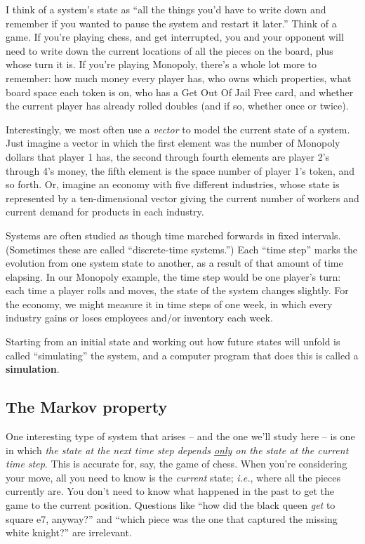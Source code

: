 
I think of a system's state as ``all the things you'd have to write down and
remember if you wanted to pause the system and restart it later.'' Think of a
game. If you're playing chess, and get interrupted, you and your opponent will
need to write down the current locations of all the pieces on the board, plus
whose turn it is. If you're playing Monopoly, there's a whole lot more to
remember: how much money every player has, who owns which properties, what
board space each token is on, who has a Get Out Of Jail Free card, and whether 
the current player has already rolled doubles (and if so, whether once or
twice).


Interestingly, we most often use a \textit{vector} to model the current state
of a system. Just imagine a vector in which the first element was the number of
Monopoly dollars that player 1 has, the second through fourth elements are
player 2's through 4's money, the fifth element is the space number of player
1's token, and so forth. Or, imagine an economy with five different industries,
whose state is represented by a ten-dimensional vector giving the current
number of workers and current demand for products in each industry.


Systems are often studied as though time marched forwards in fixed intervals.
(Sometimes these are called ``discrete-time systems.'') Each ``time step''
marks the evolution from one system state to another, as a result of that
amount of time elapsing. In our Monopoly example, the time step would be one
player's turn: each time a player rolls and moves, the state of the system
changes slightly. For the economy, we might measure it in time steps of one
week, in which every industry gains or loses employees and/or inventory each
week.


Starting from an initial state and working out how future states will unfold is
called ``simulating'' the system, and a computer program that does this is
called a \textbf{simulation}.

\subsection{The Markov property}

One interesting type of system that arises -- and the one we'll study here --
is one in which \textit{the state at the next time step depends
\underline{only} on the state at the current time step}. This is accurate for,
say, the game of chess. When you're considering your move, all you need to know
is the \textit{current} state; \textit{i.e.}, where all the pieces currently
are. You don't need to know what happened in the past to get the game to the
current position. Questions like ``how did the black queen \textit{get} to
square e7, anyway?'' and ``which piece was the one that captured the missing
white knight?'' are irrelevant.

